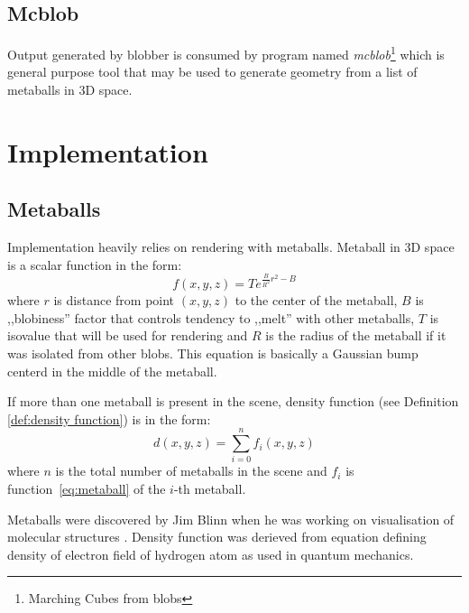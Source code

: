 \subsection{Mcblob}
Output generated by blobber is consumed by program named \emph{mcblob}\footnote{Marching
Cubes from blobs} which is general purpose tool that may be used to
generate geometry from a list of metaballs in 3D space.

\section{Implementation}
\subsection{Metaballs}
Implementation heavily relies on rendering with metaballs. Metaball in 3D space
is a scalar function in the form:
\begin{equation}
  f(x,y,z)=Te^{\frac{B}{R^2}r^2 - B}
  \label{eq:metaball}
\end{equation}
where $r$ is distance from point $(x,y,z)$ to the center of the metaball, $B$ is
,,blobiness'' factor that controls tendency to ,,melt'' with other metaballs, $T$
is isovalue that will be used for rendering and $R$ is the radius of the
metaball if it was isolated from other blobs. This equation is basically a
Gaussian bump centerd in the middle of the metaball.

If more than one metaball is present in the scene, density function (see Definition
\autoref{def:density function})
is in the form:
\begin{equation}
  d(x,y,z) = \sum_{i=0}^{n} f_i(x,y,z)
  \label{eq:metaballdensity}
\end{equation}
where $n$ is the total number of metaballs in the scene and $f_i$ is function~\ref{eq:metaball}
of the $i$-th metaball.

Metaballs were discovered by Jim Blinn when he was working on visualisation of
molecular structures \parencite{Blinn:1982:GAS:357306.357310}. Density function 
was derieved from equation defining density of electron field of hydrogen atom
as used in quantum mechanics.


